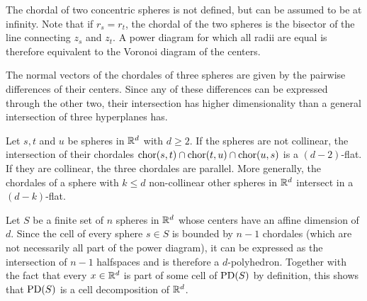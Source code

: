 The chordal of two concentric spheres is not defined, but can be assumed to be at infinity.
Note that if $r_s = r_t$, the chordal of the two spheres is the bisector of the line connecting $z_s$ and $z_t$.
A power diagram for which all radii are equal is therefore equivalent to the Voronoi diagram of the centers.

The normal vectors of the chordales of three spheres are given by the pairwise differences of their centers.
Since any of these differences can be expressed through the other two, their intersection has higher dimensionality than a general intersection of three hyperplanes has.
\begin{observation}
    \label{obs:cellsarepolyhedra}
    Let $s, t$ and $u$ be spheres in $\mathbb{R}^d$ with $d \geq 2$.
    If the spheres are not collinear, the intersection of their chordales $\operatorname{chor}(s,t) \cap \operatorname{chor}(t, u) \cap \operatorname{chor}(u, s)$ is a $(d-2)$-flat.
    If they are collinear, the three chordales are parallel.
    More generally, the chordales of a sphere with $k \leq d$ non-collinear other spheres in $\mathbb{R}^d$ intersect in a $(d-k)$-flat.
\end{observation}

Let $S$ be a finite set of $n$ spheres in $\mathbb{R}^d$ whose centers have an affine dimension of $d$.
Since the cell of every sphere $s \in S$ is bounded by $n - 1$ chordales (which are not necessarily all part of the power diagram), it can be expressed as the intersection of $n - 1$ halfspaces and is therefore a $d$-polyhedron.
Together with the fact that every $x \in \mathbb{R}^d$ is part of some cell of $\operatorname{PD}(S)$ by definition, this shows that $\operatorname{PD}(S)$ is a cell decomposition of $\mathbb{R}^d$.

